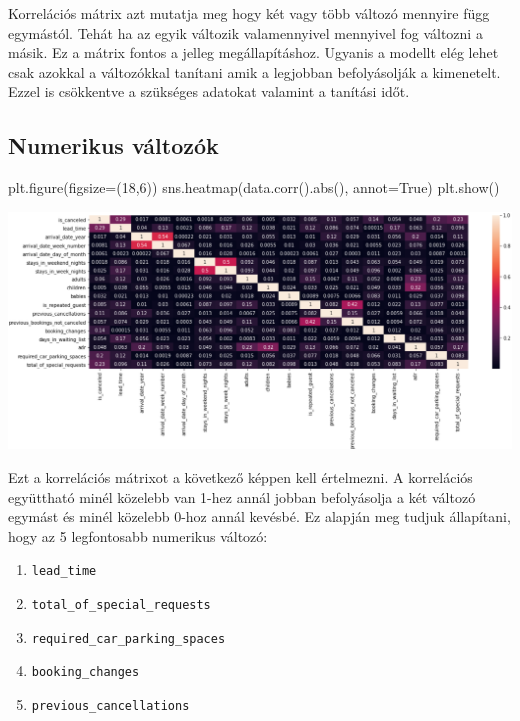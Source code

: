 
Korrelációs mátrix azt mutatja meg hogy két vagy több változó mennyire függ egymástól. Tehát ha az egyik változik valamennyivel mennyivel fog változni a másik. Ez a mátrix fontos a jelleg megállapításhoz. Ugyanis a modellt elég lehet csak azokkal a változókkal tanítani amik a legjobban befolyásolják a kimenetelt. Ezzel is csökkentve a szükséges adatokat valamint a tanítási időt.
\subsection{Numerikus változók}

\begin{python}
plt.figure(figsize=(18,6))
sns.heatmap(data.corr().abs(), annot=True)
plt.show()
\end{python}

\includegraphics[scale=0.53]{images/4.fejezet/4.korrelacios.PNG}

Ezt a korrelációs mátrixot a következő képpen kell értelmezni. A korrelációs együttható minél közelebb van 1-hez annál jobban befolyásolja a két változó egymást és minél közelebb 0-hoz annál kevésbé. 
Ez alapján meg tudjuk állapítani, hogy az 5 legfontosabb numerikus változó:
\begin{enumerate}
    \item \texttt{lead\_time}
    \item \texttt{total\_of\_special\_requests}
    \item \texttt{required\_car\_parking\_spaces}
    \item \texttt{booking\_changes}
    \item \texttt{previous\_cancellations}
\end{enumerate}

